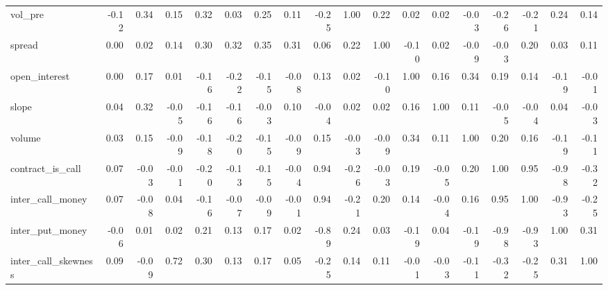 \begin{tabular}{lrrrrrrrrrrrrrrrrr}
vol\_pre             &    -0.12 &        0.34 &      0.15 &    0.32 &          0.03 &        0.25 &  0.11 &    -0.25 &     1.00 &    0.22 &           0.02 &   0.02 &   -0.03 &             -0.26 &             -0.21 &             0.24 &                 0.14 \\
spread              &     0.00 &        0.02 &      0.14 &    0.30 &          0.32 &        0.35 &  0.31 &     0.06 &     0.22 &    1.00 &          -0.10 &   0.02 &   -0.09 &             -0.03 &              0.20 &             0.03 &                 0.11 \\
open\_interest       &     0.00 &        0.17 &      0.01 &   -0.16 &         -0.22 &       -0.15 & -0.08 &     0.13 &     0.02 &   -0.10 &           1.00 &   0.16 &    0.34 &              0.19 &              0.14 &            -0.19 &                -0.01 \\
slope               &     0.04 &        0.32 &     -0.05 &   -0.16 &         -0.16 &       -0.03 &  0.10 &    -0.04 &     0.02 &    0.02 &           0.16 &   1.00 &    0.11 &             -0.05 &             -0.04 &             0.04 &                -0.03 \\
volume              &     0.03 &        0.15 &     -0.09 &   -0.18 &         -0.20 &       -0.15 & -0.09 &     0.15 &    -0.03 &   -0.09 &           0.34 &   0.11 &    1.00 &              0.20 &              0.16 &            -0.19 &                -0.11 \\
contract\_is\_call    &     0.07 &       -0.03 &     -0.01 &   -0.20 &         -0.13 &       -0.15 & -0.04 &     0.94 &    -0.26 &   -0.03 &           0.19 &  -0.05 &    0.20 &              1.00 &              0.95 &            -0.98 &                -0.32 \\
inter\_call\_money    &     0.07 &       -0.08 &      0.04 &   -0.16 &         -0.07 &       -0.09 & -0.01 &     0.94 &    -0.21 &    0.20 &           0.14 &  -0.04 &    0.16 &              0.95 &              1.00 &            -0.93 &                -0.25 \\
inter\_put\_money     &    -0.06 &        0.01 &      0.02 &    0.21 &          0.13 &        0.17 &  0.02 &    -0.89 &     0.24 &    0.03 &          -0.19 &   0.04 &   -0.19 &             -0.98 &             -0.93 &             1.00 &                 0.31 \\
inter\_call\_skewness &     0.09 &       -0.09 &      0.72 &    0.30 &          0.13 &        0.17 &  0.05 &    -0.25 &     0.14 &    0.11 &          -0.01 &  -0.03 &   -0.11 &             -0.32 &             -0.25 &             0.31 &                 1.00 \\
\bottomrule
\end{tabular}
